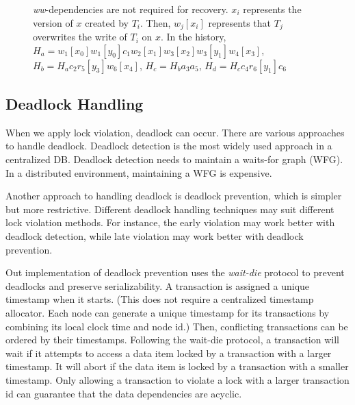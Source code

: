\documentclass[conference]{IEEEtran}
\begin{document}
\begin{figure}[tbp]
  \caption{\emph{ww}-dependencies are not required for recovery.
  ${x_i}$ represents the version of $x$ created by ${T_i}$.
 Then, $w_j[x_i]$ represents that ${T_j}$ overwrites the write of ${T_i}$ on $x$. In the history, ${H_a = w_1[x_0]w_1[y_0]c_1w_2[x_1]w_3[x_2]w_3[y_1]w_4[x_3]}$, 
 ${H_b = H_a c_2r_5[y_3]w_6[x_4]}$,
 ${H_c = H_b a_3a_5}$, 
 ${H_d = H_c c_4r_6[y_1]c_6}$
}
\label{fig:versions_example}
\end{figure}


\subsection {Deadlock Handling}
\label{sec:deadlock_handling}
When we apply lock violation, deadlock can occur.
There are various approaches to handle deadlock.
Deadlock detection is the most widely used approach in a centralized DB.
Deadlock detection needs to maintain a waits-for graph (WFG).
In a distributed environment, maintaining a WFG is expensive.


Another approach to handling deadlock is deadlock prevention, which is simpler but more restrictive.
Different deadlock handling techniques may suit different lock violation methods.
For instance, the early violation may work better with deadlock detection, while late violation may work better with deadlock prevention.

Out implementation of deadlock prevention uses the \emph{wait-die} protocol to prevent deadlocks and preserve serializability.
A transaction is assigned a unique timestamp when it starts.
(This does not require a centralized timestamp allocator.
Each node can generate a unique timestamp for its transactions by combining its local clock time and node id.)
Then, conflicting transactions can be ordered by their timestamps.
Following the wait-die protocol, a transaction will wait if it attempts to access a data item locked by a transaction with a larger timestamp.
It will abort if the data item is locked by a transaction with a smaller timestamp.
Only allowing a transaction to violate a lock with a larger transaction id can guarantee that the data dependencies are acyclic.
\end{document}
